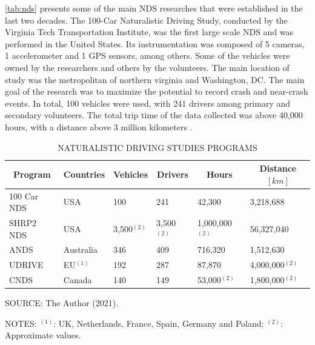 
\autoref{tab:nds} presents some of the main NDS researches that were established in the last two decades. The 100-Car Naturalistic Driving Study, conducted by the Virginia Tech Transportation Institute, was the first large scale NDS and was performed in the United States. Its instrumentation was composed of 5 cameras, 1 accelerometer and 1 GPS sensors, among others. Some of the vehicles were owned by the researchers and others by the volunteers. The main location of study was the metropolitan of northern virginia and Washington, DC. The main goal of the research was to maximize the potential to record crash and near-crash events. In total, 100 vehicles were used, with 241 drivers among primary and secondary volunteers. The total trip time of the data collected was above 40,000 hours, with a distance above 3 million kilometers \cite{Neale2005}.

\begin{table}[!hbtp]
    \footnotesize
    \captionsetup{justification=raggedright,
        singlelinecheck=false,
        font=footnotesize}
    \caption{NATURALISTIC DRIVING STUDIES PROGRAMS}
    \centering
    \begin{tabular}{llllll}
        \hline
        \multicolumn{1}{c}{\textbf{Program}} & \multicolumn{1}{c}{\textbf{Countries}} & \multicolumn{1}{c}{\textbf{Vehicles}} & \multicolumn{1}{c}{\textbf{Drivers}} & \multicolumn{1}{c}{\textbf{Hours}} & \multicolumn{1}{c}{\textbf{Distance} $[km]$} \\
        \hline
        100 Car NDS & USA & 100 & 241 & 42,300 & 3,218,688 \\
        SHRP2 NDS & USA & 3,500$^{(2)}$ & 3,500$^{(2)}$ & 1,000,000$^{(2)}$ & 56,327,040 \\
        ANDS & Australia & 346 & 409 & 716,320 & 1,512,630 \\
        UDRIVE & EU$^{(1)}$ & 192 & 287 & 87,870 & 4,000,000$^{(2)}$ \\
        CNDS & Canada & 140 & 149 & 53,000$^{(2)}$ & 1,800,000$^{(2)}$ \\ 
        \hline
    \end{tabular}
    \label{tab:nds}
    \par \vspace{2mm} \footnotesize \raggedright
    SOURCE: The Author (2021).
    \par \vspace{1mm} \footnotesize \raggedright
    NOTES: $^{(1)}$: UK, Netherlands, France, Spain, Germany and Poland; $^{(2)}$: Approximate values.
\end{table}

